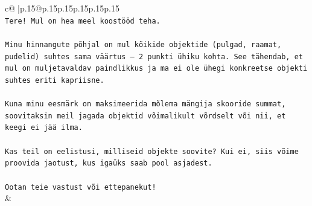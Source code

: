 \documentclass{article}
\begin{document}
{\begin{supertabular}{c@{$\;$}|p{.15\linewidth}@{}p{.15\linewidth}p{.15\linewidth}p{.15\linewidth}p{.15\linewidth}p{.15\linewidth}}
{{{\\ 
\texttt{Tere! Mul on hea meel koostööd teha.} \\
\\ 
\texttt{Minu hinnangute põhjal on mul kõikide objektide (pulgad, raamat, pudelid) suhtes sama väärtus – 2 punkti ühiku kohta. See tähendab, et mul on muljetavaldav paindlikkus ja ma ei ole ühegi konkreetse objekti suhtes eriti kapriisne.} \\
\\ 
\texttt{Kuna minu eesmärk on maksimeerida mõlema mängija skooride summat, soovitaksin meil jagada objektid võimalikult võrdselt või nii, et keegi ei jää ilma.} \\
\\ 
\texttt{Kas teil on eelistusi, milliseid objekte soovite? Kui ei, siis võime proovida jaotust, kus igaüks saab pool asjadest.} \\
\\ 
\texttt{Ootan teie vastust või ettepanekut!} \\
            }
        }
    }
    & \\ \\


\end{supertabular}}
\end{document}
